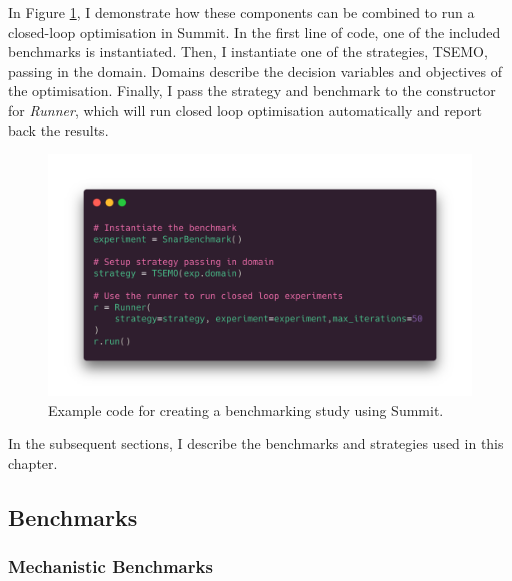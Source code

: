 In Figure \ref{fig:code_example}, I demonstrate how these components can be combined to run a closed-loop optimisation in Summit. In the first line of code, one of the included benchmarks is instantiated. Then, I instantiate one of the strategies, TSEMO, passing in the domain. Domains describe the decision variables and objectives of the optimisation. Finally, I pass the strategy and benchmark to the constructor for \textit{Runner}, which will run closed loop optimisation automatically and report back the results. 

\begin{figure}
    \centering
    \includegraphics[width=\textwidth]{gfx/Chapter03/paraiso.png}
    \caption{Example code for creating a benchmarking study using Summit.}
    \label{fig:code_example}
\end{figure}

In the subsequent sections, I describe the benchmarks and strategies used in this chapter.

\subsection{Benchmarks}

\subsubsection{Mechanistic Benchmarks}


